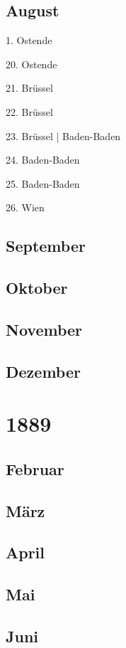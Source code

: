 \documentclass[twoside=false,titlepage=false,open=any, parskip=never, fontsize=10pt, headings=small, chapterprefix=false, appendixprefix=false, DIV=15]{scrbook}
\begin{document}
\begin{multicols}{3}
            \section*{August}
            1. Ostende\par
            20. Ostende\par
            21. Brüssel\par
            22. Brüssel\par
            23. Brüssel | Baden-Baden\par
            24. Baden-Baden\par
            25. Baden-Baden\par
            26. Wien\par
            \section*{September}
            \section*{Oktober}
            \section*{November}
            \section*{Dezember}
            \chapter*{1889}
            \section*{Februar}
            \section*{März}
            \section*{April}
            \section*{Mai}
            \section*{Juni}

\end{multicols}
\end{document}

